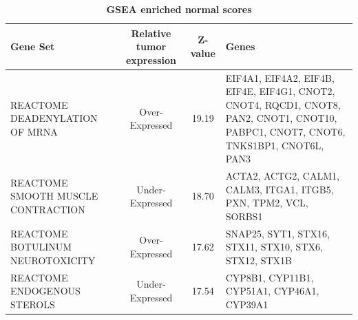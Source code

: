 \documentclass[9pt,twocolumn,twoside]{gsajnl}
\begin{document}
\begin{table}[htbp]
\centering
\caption{\bf GSEA enriched normal scores}
\begin{tableminipage}{\textwidth}
\begin{tabular}{|l|c|c|p{3cm}|}
 \hline
Gene Set & Relative tumor expression &  Z-value & Genes \\ 
  \hline
REACTOME DEADENYLATION OF MRNA & Over-Expressed  & 19.19 & EIF4A1, EIF4A2, EIF4B, EIF4E, EIF4G1, CNOT2, CNOT4, RQCD1, CNOT8, PAN2, CNOT1, CNOT10, PABPC1, CNOT7, CNOT6, TNKS1BP1, CNOT6L, PAN3 \\ 
REACTOME SMOOTH MUSCLE CONTRACTION & Under-Expressed & 18.70 & ACTA2, ACTG2, CALM1, CALM3, ITGA1, ITGB5, PXN, TPM2, VCL, SORBS1 \\ 
REACTOME BOTULINUM NEUROTOXICITY & Over-Expressed &  17.62 & SNAP25, SYT1, STX16, STX11, STX10, STX6, STX12, STX1B \\ 
REACTOME ENDOGENOUS STEROLS & Under-Expressed & 17.54 & CYP8B1, CYP11B1, CYP51A1, CYP46A1, CYP39A1 \\  
\hline
\end{tabular}
\label{tab:GSEAenrichment}
\end{tableminipage}
\end{table}







\end{document}
